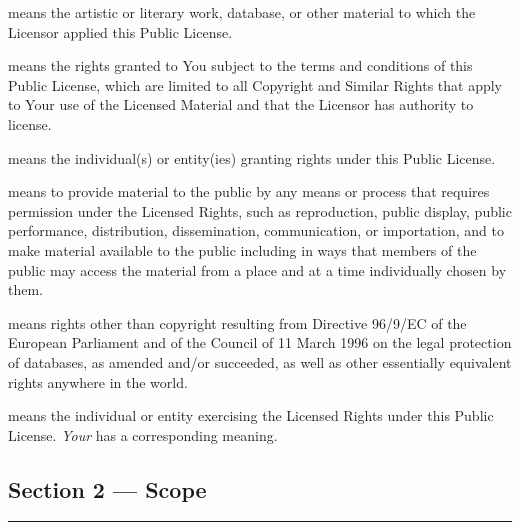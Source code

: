 \begin{description}[
		style=nextline,
		leftmargin=0pt,
		labelindent=0pt,
		font=\normalfont\bfseries\sffamily,
		itemsep=0.7em,
		parsep=0pt
	]
	\item[Licensed Material]
	      means the artistic or literary work, database, or other material to which the Licensor applied this Public License.

	\item[Licensed Rights]
	      means the rights granted to You subject to the terms and conditions of this Public License, which are limited to all Copyright and Similar Rights that apply to Your use of the Licensed Material and that the Licensor has authority to license.

	\item[Licensor]
	      means the individual(s) or entity(ies) granting rights under this Public License.

	\item[Share]
	      means to provide material to the public by any means or process that requires permission under the Licensed Rights, such as reproduction, public display, public performance, distribution, dissemination, communication, or importation, and to make material available to the public including in ways that members of the public may access the material from a place and at a time individually chosen by them.

	\item[Sui Generis Database Rights]
	      means rights other than copyright resulting from Directive 96/9/EC of the European Parliament and of the Council of 11 March 1996 on the legal protection of databases, as amended and/or succeeded, as well as other essentially equivalent rights anywhere in the world.

	\item[You]
	      means the individual or entity exercising the Licensed Rights under this Public License. \textit{Your} has a corresponding meaning.
\end{description}

\subsection*{Section 2 --- Scope}
\noindent\rule{\textwidth}{0.3pt}
\smallskip

